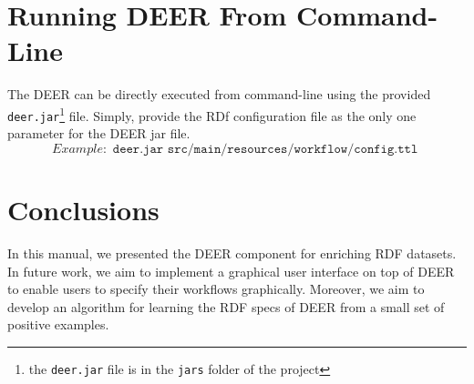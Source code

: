 \documentclass[a4paper,twoside,bibtotoc,abstracton,12pt,BCOR=15mm]{article}
\newcommand{\geolift}{\textsc{DEER}\xspace}
\begin{document}
\section{Running \geolift From Command-Line }

The \geolift can be directly executed from command-line using the provided \texttt{deer.jar}\footnote{the \texttt{deer.jar} file is in the \texttt{jars} folder of the project} file.
Simply, provide the RDf configuration file as the only one parameter for the \geolift jar file.
\begin{equation*}
  Example: \texttt{ deer.jar src/main/resources/workflow/config.ttl }
\end{equation*}

\section{Conclusions}
In this manual, we presented the \geolift component for enriching RDF datasets.
In future work, we aim to implement a graphical user interface on top of \geolift to enable users to specify their workflows graphically.
Moreover, we aim to develop an algorithm for learning the RDF specs of \geolift from a small set of positive examples.



\end{document}
